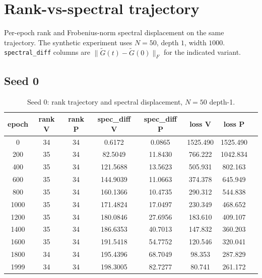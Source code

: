 \section{Rank-vs-spectral trajectory}
\label{app:rank-spec}

Per-epoch rank and Frobenius-norm spectral displacement on the same trajectory. The synthetic experiment uses $N = 50$, depth $1$, width $1000$. \texttt{spectral\_diff} columns are $\| \widetilde{G}(t) - \widetilde{G}(0) \|_F$ for the indicated variant.

\subsection*{Seed 0}
\begin{table}[H]
\centering
\caption{Seed 0: rank trajectory and spectral displacement, $N = 50$ depth-1.}
\label{tab:ranspec-s0}
\begin{tabular}{c c c c c c c c}
\toprule
epoch & rank V & rank P & spec\_diff V & spec\_diff P & loss V & loss P \\
\midrule
0 & 34 & 34 & 0.6172 & 0.0865 & 1525.490 & 1525.490 \\
200 & 35 & 34 & 82.5049 & 11.8430 & 766.222 & 1042.834 \\
400 & 35 & 34 & 121.5688 & 13.5623 & 505.931 & 802.163 \\
600 & 35 & 34 & 144.9039 & 11.0663 & 374.378 & 645.949 \\
800 & 35 & 34 & 160.1366 & 10.4735 & 290.312 & 544.838 \\
1000 & 35 & 34 & 171.4824 & 17.0497 & 230.349 & 468.652 \\
1200 & 35 & 34 & 180.0846 & 27.6956 & 183.610 & 409.107 \\
1400 & 35 & 34 & 186.6353 & 40.7013 & 147.832 & 360.203 \\
1600 & 35 & 34 & 191.5418 & 54.7752 & 120.546 & 320.041 \\
1800 & 34 & 34 & 195.4396 & 68.7049 & 98.353 & 287.829 \\
1999 & 34 & 34 & 198.3005 & 82.7277 & 80.741 & 261.172 \\
\bottomrule
\end{tabular}
\end{table}

